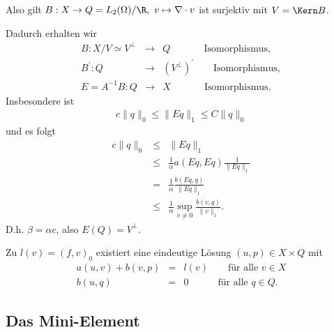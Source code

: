 Also gilt $B: X \to Q = L_2(\Omega) / \R, \ v \mapsto \nabla \cdot v$ ist
surjektiv mit $V = \Kern B$.

Dadurch erhalten wir
\begin{eqnarray*}
    B: X/V \simeq V^\bot &\to& Q \qquad \ \quad \ \text{Isomorphismus}, \\
    B^\prime: Q &\to& (V^\bot)^\prime \qquad \text{Isomorphismus}, \\
    E = A^{-1} B: Q &\to& X \qquad \ \quad \ \text{Isomorphismus}.
\end{eqnarray*}
Insbesondere ist
\begin{eqnarray*}
    c \|q\|_0 \le \|Eq\|_1 \le C \|q\|_0
\end{eqnarray*}
und es folgt
\begin{eqnarray*}
          c \|q\|_0
    &\le& \|Eq\|_1 \\
    &\le& \frac{1}{\alpha} a(Eq, Eq) \frac{1}{\|Eq\|_1} \\
    &=& \frac{1}{\alpha} \frac{b(Eq, q)}{\|Eq\|_1} \\
    &\le& \frac{1}{\alpha} \sup_{v \neq 0} \frac{b(v, q)}{\|v\|_1}.
\end{eqnarray*}
D.h. $\beta = \alpha c$, also $E(Q) = V^\bot$.


\begin{Folgerung}
    \label{folgerung:5.12}
    Zu $l(v) = (f, v)_0$ existiert eine eindeutige Lösung
    $(u, p)\in X \times Q$ mit
    \begin{eqnarray*}
        a(u, v) + b(v, p) &=& l(v) \qquad \text{für alle } v\in X \\
        b(u, q) &=& 0 \qquad \quad \text{für alle } q\in Q.
    \end{eqnarray*}
\end{Folgerung}


\subsection{Das Mini-Element}



